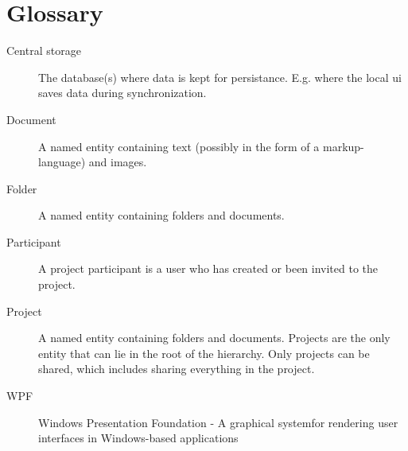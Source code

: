 \section{Glossary}
\label{sec:glossary}

\begin{description}

    \item[Central storage] The database(s) where data is kept for persistance. E.g. where the local ui saves data during synchronization.
    \item[Document] A named entity containing text (possibly in the form of a markup-language) and images.
    \item[Folder] A named entity containing folders and documents.
    \item[Participant] A project participant is a user who has created or been invited to the project.
    \item[Project] A named entity containing folders and documents. Projects are the only entity that
        can lie in the root of the hierarchy. Only projects can be shared, which includes sharing
        everything in the project.
    \item[WPF] Windows Presentation Foundation - A graphical systemfor rendering user interfaces in Windows-based applications

\end{description}
